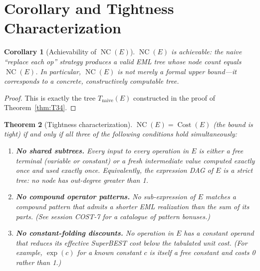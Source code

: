 \documentclass[12pt,a4paper]{article}
\newtheorem{theorem}{Theorem}[section]
\newtheorem{corollary}[theorem]{Corollary}
\theoremstyle{definition}
\newcommand{\NC}{\operatorname{NC}}
\newcommand{\Cost}{\operatorname{Cost}}
\begin{document}
\section{Corollary and Tightness Characterization}
\label{sec:tightness}

\begin{corollary}[Achievability of $\NC(E)$]
\label{cor:achievable}
$\NC(E)$ is achievable: the naive ``replace each op'' strategy produces a
valid EML tree whose node count equals $\NC(E)$.
In particular, $\NC(E)$ is not merely a formal upper bound---it corresponds
to a concrete, constructively computable tree.
\end{corollary}

\begin{proof}
This is exactly the tree $T_{\mathrm{naive}}(E)$ constructed in the proof
of Theorem~\ref{thm:T34}.
\end{proof}

\begin{theorem}[Tightness characterization]
\label{thm:tight}
$\NC(E) = \Cost(E)$ (the bound is tight) if and only if all three of the
following conditions hold simultaneously:
\begin{enumerate}
  \item[\textup{(a)}] \textbf{No shared subtrees.}
        Every input to every operation in $E$ is either a free terminal
        (variable or constant) or a fresh intermediate value computed
        exactly once and used exactly once.
        Equivalently, the expression DAG of $E$ is a strict tree: no node
        has out-degree greater than 1.

  \item[\textup{(b)}] \textbf{No compound operator patterns.}
        No sub-expression of $E$ matches a compound pattern that admits a
        shorter EML realization than the sum of its parts.
        (See session COST-7 for a catalogue of pattern bonuses.)

  \item[\textup{(c)}] \textbf{No constant-folding discounts.}
        No operation in $E$ has a constant operand that reduces its effective
        SuperBEST cost below the tabulated unit cost.
        (For example, $\operatorname{exp}(c)$ for a known constant $c$ is
        itself a free constant and costs 0 rather than 1.)
\end{enumerate}
\end{theorem}
\end{document}
